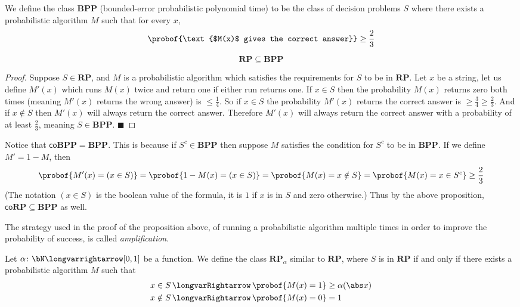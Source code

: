 \documentclass[10pt]{article}
\def\implies{\,\longvarRightarrow\,}
\let\longto=\longvarrightarrow
\def\co{\mathsf{co}}
\def\RP{\mathbf{RP}}
\def\BPP{\mathbf{BPP}}
\def\qed{%
    \ifmmode%
        \eqno\blacksquare%
    \else%
        \hskip1cm\allowbreak\hbox{}\nobreak\hfill$\blacksquare$%
    \fi%
}
\begin{document}
\begin{defn*}

    We define the class $\BPP$ (bounded-error probabilistic polynomial time) to be the class of decision problems $S$ where there exists a probabilistic algorithm $M$ such that for every $x$,
    \[ \probof{\text{$M(x)$ gives the correct answer}} \geq \frac23 \]

\end{defn*}

\begin{prop*}

    \[ \RP \subseteq \BPP \]

\end{prop*}

\begin{proof}

    Suppose $S\in\RP$, and $M$ is a probabilistic algorithm which satisfies the requirements for $S$ to be in $\RP$.
    Let $x$ be a string, let us define $M'(x)$ which runs $M(x)$ twice and return one if either run returns one.
    If $x\in S$ then the probability $M(x)$ returns zero both times (meaning $M'(x)$ returns the wrong answer) is $\leq\frac14$.
    So if $x\in S$ the probability $M'(x)$ returns the correct answer is $\geq\frac34\geq\frac23$.
    And if $x\notin S$ then $M'(x)$ will always return the correct answer.
    Therefore $M'(x)$ will always return the correct answer with a probability of at least $\frac23$, meaning $S\in\BPP$.
    \qed

\end{proof}

Notice that $\co\BPP=\BPP$.
This is because if $S^c\in\BPP$ then suppose $M$ satisfies the condition for $S^c$ to be in $\BPP$.
If we define $M'=1-M$, then 
\[ \probof{M'(x)=(x\in S)} = \probof{1-M(x)=(x\in S)} = \probof{M(x)=x\notin S} = \probof{M(x)=x\in S^c} \geq\frac23 \]
(The notation $(x\in S)$ is the boolean value of the formula, it is $1$ if $x$ is in $S$ and zero otherwise.)
Thus by the above proposition, $\co\RP\subseteq\BPP$ as well.

The strategy used in the proof of the proposition above, of running a probabilistic algorithm multiple times in order to improve the probability of success, is called \emph{amplification}.

\begin{defn*}

    Let $\alpha\colon\bN\longto[0,1]$ be a function.
    We define the class $\RP_\alpha$ similar to $\RP$, where $S$ is in $\RP$ if and only if there exists a probabilistic algorithm $M$ such that
    \begin{align*}
        x\in S &\implies \probof{M(x)=1}\geq\alpha(\abs x) \\
        x\notin S&\implies \probof{M(x)=0}=1
    \end{align*}

\end{defn*}
\end{document}

